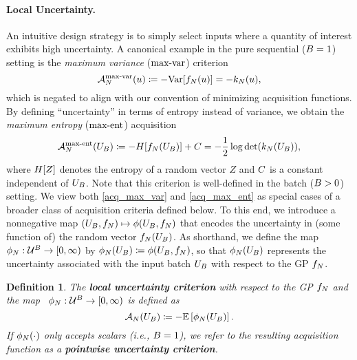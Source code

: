 \documentclass[12pt]{article}
\newtheorem{definition}{Definition}
\begin{document}
\paragraph{Local Uncertainty.}
An intuitive design strategy is to simply select inputs where a quantity of interest exhibits high 
uncertainty. A canonical example in the pure sequential ($\Nbatch = 1$) setting is
the \textit{maximum variance} ($\maxvarLabel$) criterion
\begin{equation}
\labelAcq[\Ndesign]{\maxvarLabel}(\Par) \Def -\Var[\funcEm[\Ndesign](\Par)]  =  -\gpKer(\Par),
\label{acq_max_var}
\end{equation}
which is negated to align with our convention of minimizing acquisition functions. By defining 
``uncertainty'' in terms of entropy instead of variance, we obtain the \textit{maximum entropy} 
($\maxentLabel$) acquisition
\begin{equation}
\labelAcq[\Ndesign]{\maxentLabel}(\designBatchIn) \Def -\Ent[\funcEm[\Ndesign](\designBatchIn)] + \cst 
=  -\frac{1}{2} \log\det(\gpKer(\designBatchIn)), 
\label{acq_max_ent}
\end{equation}
where $\Ent[Z]$ denotes the entropy of a random vector $Z$ and $\cst$ is a constant independent 
of $\designBatchIn$. Note that this criterion is well-defined in the batch ($\Nbatch > 0$) setting.
We view both \ref{acq_max_var} and \ref{acq_max_ent} as special cases of a broader class 
of acquisition criteria defined below. To this end, we introduce a nonnegative map 
$(\designBatchIn, \funcEm) \mapsto \qoiMap(\designBatchIn, \funcEm)$ that encodes the 
uncertainty in (some function of) the random vector  $\funcEm(\designBatchIn)$. As shorthand, 
we define the map $\qoi: \parSpace^{\Nbatch} \to [0, \infty)$ by 
$\qoi(\designBatchIn) \Def \qoiMap(\designBatchIn, \funcEm)$, so that 
$\qoi(\designBatchIn)$ represents the uncertainty associated with the input batch 
$\designBatchIn$ with respect to the GP $\funcEm$.

\begin{definition}
The \textbf{local uncertainty criterion} with respect to the GP $\funcEm$ and the map \
$\qoi: \parSpace^{\Nbatch} \to [0, \infty)$
is defined as 
\begin{equation}
\acq[\Ndesign](\designBatchIn) \Def -\E\left[\qoi(\designBatchIn) \right]. \label{acq_local_unc}
\end{equation}
If $\qoi(\cdot)$ only accepts scalars (i.e., $\Nbatch = 1$), we refer to the resulting acquisition function as
 a \textbf{pointwise uncertainty criterion}.
\end{definition}
\end{document}
